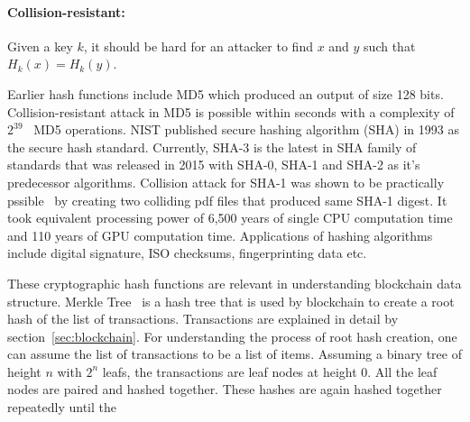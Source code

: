 \paragraph{Collision-resistant:} Given a key $k$, it should be hard for an
attacker to find $x$ and $y$ such that $H_k(x) = H_k(y)$. \par   
Earlier hash functions include MD5 which produced an output of size 128 bits.
Collision-resistant attack in MD5 is possible within seconds with a complexity
of $2^{39}$~\cite{wang2005break} MD5 operations. NIST published secure hashing algorithm (SHA)
in 1993 as the secure hash standard. Currently, SHA-3 is the latest in SHA
family of standards that was released in 2015 with SHA-0, SHA-1 and SHA-2 as
it's predecessor algorithms. Collision attack for SHA-1 was shown to be
practically pssible~\cite{stevens2017first} by creating two colliding pdf files
that produced same SHA-1 digest. It took equivalent processing power of 6,500
years of single CPU computation time and 110 years of GPU computation time.
Applications of hashing algorithms include digital signature, ISO checksums,
fingerprinting data etc. \par
These cryptographic hash functions are relevant in understanding blockchain
data structure. Merkle Tree~\cite{becker2008merkle,Berkeley} is a hash tree that is used
by blockchain to create a root hash of the list of transactions. Transactions
are explained in detail by section~\ref{sec:blockchain}. For understanding the
process of root hash creation, one can assume the list of transactions to be a
list of items. Assuming a binary tree of height $n$ with $2^{n}$ leafs, the
transactions are leaf nodes at height $0$. All the leaf nodes are paired and
hashed together. These hashes are again hashed together repeatedly until the
